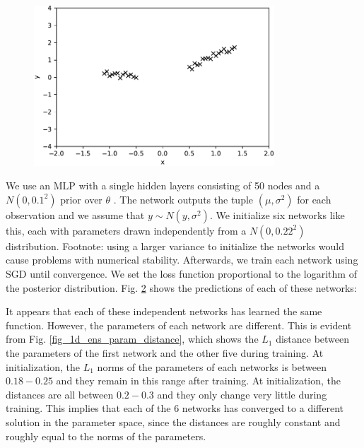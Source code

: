 \documentclass[12pt]{article}
\begin{document}
\begin{figure}[ht]
\centering
\includegraphics[width=9cm]{plots/1d_dataset.pdf}
\caption{}
\label{fig_1d_dataset}
\end{figure}

We use an MLP with a single hidden layers consisting of 50 nodes and a $N(0, 0.1^2)$ prior over $\theta$ . The network outputs the tuple $(\mu, \sigma^2)$ for each observation and we assume that $y \sim N(y, \sigma^2)$. We initialize six networks like this, each with parameters drawn independently from a $N(0, 0.22^2)$ distribution. Footnote: using a larger variance to initialize the networks would cause problems with numerical stability. Afterwards, we train each network using SGD until convergence. We set the loss function proportional to the logarithm of the posterior distribution. Fig. \ref{fig_1d_ens_predictions} shows the predictions of each of these networks:

\begin{figure}[ht]
\centering
{}
\caption{}
\label{fig_1d_ens_predictions}
\end{figure}

It appears that each of these independent networks has learned the same function. However, the parameters of each network are different. This is evident from Fig. \ref{fig_1d_ens_param_distance}, which shows the $L_1$ distance between the parameters of the first network and the other five during training. At initialization, the $L_1$ norms of the parameters of each networks is between $0.18 - 0.25$ and they remain in this range after training. At initialization, the distances are all between $0.2 - 0.3$ and they only change very little during training. This implies that each of the 6 networks has converged to a different solution in the parameter space, since the distances are roughly constant and roughly equal to the norms of the parameters.
\end{document}
